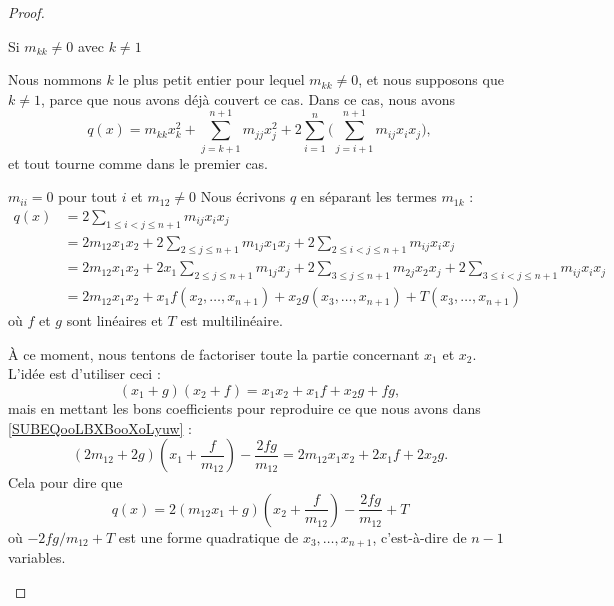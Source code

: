 \begin{proof}
\begin{subproof}
		\item[Si \( m_{kk}\neq 0\) avec \( k\neq 1\)]

		Nous nommons \( k\) le plus petit entier pour lequel \( m_{kk}\neq 0\), et nous supposons que \( k\neq 1\), parce que nous avons déjà couvert ce cas. Dans ce cas, nous avons
		\begin{equation}
			q(x)=m_{kk}x_k^2+\sum_{j=k+1}^{n+1}m_{jj}x_j^2  +2\sum_{i=1}^n\big( \sum_{j=i+1}^{n+1}m_{ij}x_ix_j \big),
		\end{equation}
		et tout tourne comme dans le premier cas.
		\item[\( m_{ii}=0\) pour tout \( i\) et \( m_{12}\neq 0\)]
		Nous écrivons \( q\) en séparant les termes \( m_{1k}\) :
		\begin{subequations}
			\begin{align}
				q(x) & =2\sum_{1\leq i<j\leq n+1}m_{ij}x_ix_j                                                                                       \\
				     & =2m_{12}x_1x_2+2\sum_{2\leq j\leq n+1}m_{1j}x_1x_j+2\sum_{2\leq i<j\leq n+1}m_{ij}x_ix_j                                     \\
				     & =2m_{12}x_1x_2+2x_1\sum_{2\leq j\leq n+1}m_{1j}x_j+2\sum_{3\leq j\leq n+1}m_{2j}x_2x_j+2\sum_{3\leq i<j\leq n+1}m_{ij}x_ix_j \\
				     & =2m_{12}x_1x_2+x_1f(x_2,\ldots, x_{n+1})+x_2g(x_3,\ldots, x_{n+1})+T(x_3,\ldots, x_{n+1})      \label{SUBEQooLBXBooXoLyuw}
			\end{align}
		\end{subequations}
		où \( f\) et \( g\) sont linéaires et \( T\) est multilinéaire.

		À ce moment, nous tentons de factoriser toute la partie concernant \( x_1\) et \( x_2\). L'idée est d'utiliser ceci :
		\begin{equation}
			(x_1+g)(x_2+f)=x_1x_2+x_1f+x_2g+fg,
		\end{equation}
		mais en mettant les bons coefficients pour reproduire ce que nous avons dans \eqref{SUBEQooLBXBooXoLyuw} :
		\begin{equation}
			(2m_{12}+2g)(x_1+\frac{ f }{ m_{12} })-\frac{ 2fg }{ m_{12} }=2m_{12}x_1x_2+2x_1f+2x_2g.
		\end{equation}
		Cela pour dire que
		\begin{equation}
			q(x)=2(m_{12}x_1+g)(x_2+\frac{ f }{ m_{12} })-\frac{ 2fg }{ m_{12} }+T
		\end{equation}
		où \(-2fg/m_{12}+T\) est une forme quadratique de \( x_3,\ldots, x_{n+1}\), c'est-à-dire de \( n-1\) variables.


\end{subproof}
\end{proof}
